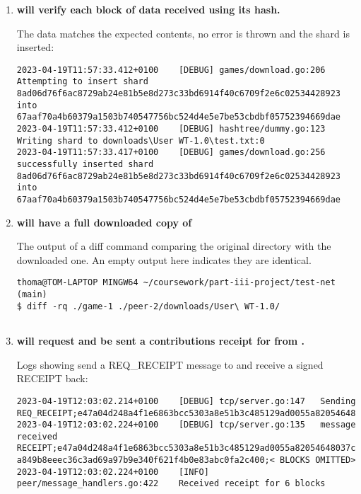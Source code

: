 \begin{enumerate}[itemsep=2.5pt]
  \item \textbf{ will verify each block of data received using its hash.}
  
  The data matches the expected contents, no error is thrown and the shard is inserted:
  
\begin{lstlisting}[breaklines=true, postbreak=\mbox{\textcolor{red}{$\hookrightarrow$}\space}]
2023-04-19T11:57:33.412+0100	[DEBUG]	games/download.go:206	Attempting to insert shard 8ad06d76f6ac8729ab24e81b5e8d273c33bd6914f40c6709f2e6c02534428923 into 67aaf70a4b60379a1503b740547756bc524d4e5e7be53cbdbf05752394669dae
2023-04-19T11:57:33.412+0100	[DEBUG]	hashtree/dummy.go:123	Writing shard to downloads\User WT-1.0\test.txt:0
2023-04-19T11:57:33.417+0100	[DEBUG]	games/download.go:256	successfully inserted shard 8ad06d76f6ac8729ab24e81b5e8d273c33bd6914f40c6709f2e6c02534428923 into 67aaf70a4b60379a1503b740547756bc524d4e5e7be53cbdbf05752394669dae
\end{lstlisting}


  \item \textbf{ will have a full downloaded copy of }
  
  The output of a diff command comparing the original directory with the downloaded one. An empty output here indicates they are identical.

\begin{lstlisting}[breaklines=true, postbreak=\mbox{\textcolor{red}{$\hookrightarrow$}\space}]
thoma@TOM-LAPTOP MINGW64 ~/coursework/part-iii-project/test-net (main)
$ diff -rq ./game-1 ./peer-2/downloads/User\ WT-1.0/


\end{lstlisting}

  \item \textbf{ will request and be sent a contributions receipt for  from .}
  
  Logs showing  send a REQ\_RECEIPT message to  and receive a signed RECEIPT back:

\begin{lstlisting}[breaklines=true, postbreak=\mbox{\textcolor{red}{$\hookrightarrow$}\space}]
2023-04-19T12:03:02.214+0100	[DEBUG]	tcp/server.go:147	Sending REQ_RECEIPT;e47a04d248a4f1e6863bcc5303a8e51b3c485129ad0055a82054648037cb4d6c
2023-04-19T12:03:02.224+0100	[DEBUG]	tcp/server.go:135	message received RECEIPT;e47a04d248a4f1e6863bcc5303a8e51b3c485129ad0055a82054648037cb4d6c;7790162ad42178687fd8353414423a8a2f8cfb54015b1b91be38d125667bc0a1604532bd9aeb3c552 a849b8eeec36c3ad69a97b9e340f621f4b0e83abc0fa2c400;< BLOCKS OMITTED>
2023-04-19T12:03:02.224+0100	[INFO]	peer/message_handlers.go:422	Received receipt for 6 blocks
\end{lstlisting}

\end{enumerate}

\begin{lstlisting}[breaklines=true, postbreak=\mbox{\textcolor{red}{$\hookrightarrow$}\space}]
  
\end{lstlisting}
